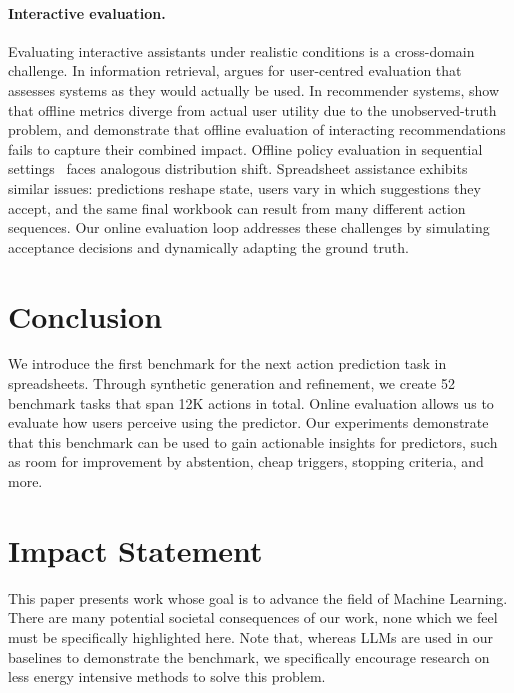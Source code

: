 \documentclass{article}
\theoremstyle{plain}
\theoremstyle{definition}
\theoremstyle{remark}
\begin{document}
\paragraph{Interactive evaluation.}
Evaluating interactive assistants under realistic conditions is a cross-domain challenge.
In information retrieval, \citet{borlund2009user} argues for user-centred evaluation that assesses systems as they would actually be used.
In recommender systems, \citet{castells2022offline} show that offline metrics diverge from actual user utility due to the unobserved-truth problem, and \citet{ferrari2022offline} demonstrate that offline evaluation of interacting recommendations fails to capture their combined impact.
Offline policy evaluation in sequential settings~\citep{mandel2014offline} faces analogous distribution shift.
Spreadsheet assistance exhibits similar issues: predictions reshape state, users vary in which suggestions they accept, and the same final workbook can result from many different action sequences.
Our online evaluation loop addresses these challenges by simulating acceptance decisions and dynamically adapting the ground truth.

\section{Conclusion}

We introduce the first benchmark for the next action prediction task in spreadsheets.
Through synthetic generation and refinement, we create 52 benchmark tasks that span 12K actions in total.
Online evaluation allows us to evaluate how users perceive using the predictor.
Our experiments demonstrate that this benchmark can be used to gain actionable insights for predictors, such as room for improvement by abstention, cheap triggers, stopping criteria, and more.


\section*{Impact Statement}

This paper presents work whose goal is to advance the field of Machine Learning. There are many potential societal consequences of our work, none which we feel must be specifically highlighted here.
Note that, whereas LLMs are used in our baselines to demonstrate the benchmark, we specifically encourage research on less energy intensive methods to solve this problem.
\end{document}
